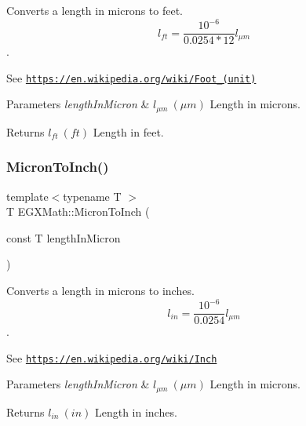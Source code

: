 Converts a length in microns to feet. \[ l_{ft}= \frac{10^{-6}}{0.0254 * 12} l_{\mu m} \]. 

See \href{https://en.wikipedia.org/wiki/Foot_(unit)}{\tt https\+://en.\+wikipedia.\+org/wiki/\+Foot\+\_\+(unit)} 
\begin{DoxyParams}{Parameters}
{\em length\+In\+Micron} & $ l_{\mu m}\ (\mu m)$ Length in microns. \\
\hline
\end{DoxyParams}
\begin{DoxyReturn}{Returns}
$ l_{ft}\ (ft)$ Length in feet. 
\end{DoxyReturn}
\mbox{\label{group___e_g_x_math-_conversions-_length_conversions-_non-_s_i-_micron-_imperial_ga12a0ceda3109e1f972dd62a797c78503}} 
\subsubsection{\texorpdfstring{Micron\+To\+Inch()}{MicronToInch()}}
{\footnotesize\ttfamily template$<$typename T $>$ \\
T E\+G\+X\+Math\+::\+Micron\+To\+Inch (\begin{DoxyParamCaption}\item[{const T}]{length\+In\+Micron }\end{DoxyParamCaption})}



Converts a length in microns to inches. \[ l_{in}= \frac{10^{-6}}{0.0254} l_{\mu m} \]. 

See \href{https://en.wikipedia.org/wiki/Inch}{\tt https\+://en.\+wikipedia.\+org/wiki/\+Inch} 
\begin{DoxyParams}{Parameters}
{\em length\+In\+Micron} & $ l_{\mu m}\ (\mu m)$ Length in microns. \\
\hline
\end{DoxyParams}
\begin{DoxyReturn}{Returns}
$ l_{in}\ (in)$ Length in inches. 
\end{DoxyReturn}
\mbox{\label{group___e_g_x_math-_conversions-_length_conversions-_non-_s_i-_micron-_imperial_ga691931fc46e3fd33d4e2d83e09fa3db4}} 
